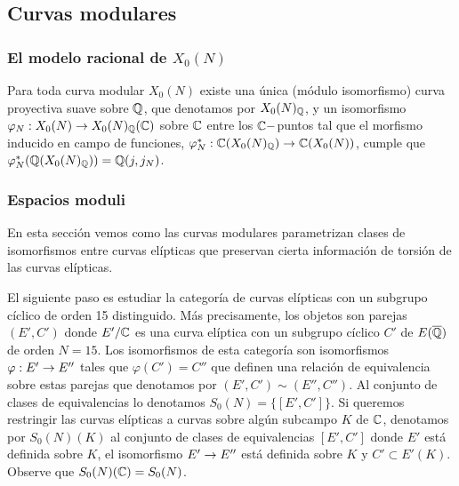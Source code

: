 \documentclass[../../tesis_maestria]{subfiles}
\begin{document}
\subsection{Curvas modulares}

\subsubsection{El modelo racional de $X_0(N)$
}
\begin{thm}\label{thm:modelo-racional}
	Para toda curva modular $X_0(N)$ existe una única (módulo isomorfismo) curva proyectiva suave sobre $\mathbb{Q}$, que denotamos por $X_0(N)_{\mathbb{Q}}$, y un isomorfismo $\varphi_N:X_0(N)\rightarrow X_0(N)_{\mathbb{Q}}(\mathbb{C})$ sobre $\mathbb{C}$ entre los $\mathbb{C}-$puntos tal que el morfismo inducido en campo de funciones, $\varphi_N^*:\mathbb{C}(X_0(N)_{\mathbb{Q}})\rightarrow\mathbb{C}(X_0(N))$, cumple que $\varphi_N^*(\mathbb{Q}(X_0(N)_{\mathbb{Q}}))=\mathbb{Q}(j,j_N)$.
\end{thm}


\subsubsection{Espacios moduli}\label{sec:curvas-modulares}
En esta sección vemos como las curvas modulares parametrizan clases de isomorfismos entre curvas elípticas que preservan cierta información de torsión de las curvas elípticas.

El siguiente paso es estudiar la categoría de curvas elípticas con un subgrupo cíclico de orden 15 distinguido. Más precisamente, los objetos son parejas $(E',C')$ donde $E'/\mathbb{C}$ es una curva elíptica con un subgrupo cíclico $C'$ de $E(\overline{\mathbb{Q}})$ de orden $N=15$. Los isomorfismos de esta categoría son isomorfismos $\varphi:E'\rightarrow E''$ tales que $\varphi(C')= C''$ que definen una relación de equivalencia sobre estas parejas que denotamos por $(E',C')\sim(E'',C'')$. Al conjunto de clases de equivalencias lo denotamos $S_0(N)=\{[E',C']\}$. Si queremos restringir las curvas elípticas a curvas sobre algún subcampo $K$ de $\mathbb{C}$, denotamos por $S_0(N)(K)$ al conjunto de clases de equivalencias $[E',C']$ donde $E'$ está definida sobre $K$, el isomorfismo $E'\rightarrow E''$ está definida sobre $K$ y $C'\subset E'(K)$. Observe que $S_0(N)(\mathbb{C})=S_0(N)$.
\end{document}
